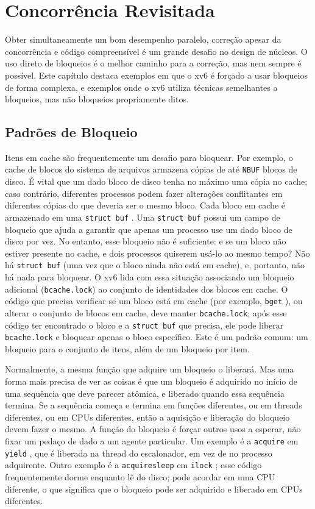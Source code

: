 \chapter{Concorrência Revisitada}
\label{CH:LOCK2}

Obter simultaneamente um bom desempenho paralelo, correção apesar da concorrência e código compreensível é um grande desafio no design de núcleos. O uso direto de bloqueios é o melhor caminho para 
a correção, mas nem sempre é possível. Este capítulo destaca exemplos em que o xv6 é forçado a usar bloqueios de forma complexa, e exemplos onde o xv6 utiliza técnicas semelhantes a bloqueios, mas 
não bloqueios propriamente ditos.

\section{Padrões de Bloqueio}

Itens em cache são frequentemente um desafio para bloquear. Por exemplo, o cache de blocos do sistema de arquivos  armazena cópias de até {\tt NBUF} blocos de disco. 
É vital que um dado bloco de disco tenha no máximo uma cópia no cache; caso contrário, diferentes processos podem fazer alterações conflitantes em diferentes cópias do que deveria ser o mesmo 
bloco. Cada bloco em cache é armazenado em uma {\tt struct buf} . Uma {\tt struct buf} possui um campo de bloqueio que ajuda a garantir que apenas um processo use um dado 
bloco de disco por vez. No entanto, esse bloqueio não é suficiente: e se um bloco não estiver presente no cache, e dois processos quiserem usá-lo ao mesmo tempo? Não há {\tt struct buf} (uma vez 
que o bloco ainda não está em cache), e, portanto, não há nada para bloquear. O xv6 lida com essa situação associando um bloqueio adicional ({\tt bcache.lock}) ao conjunto de identidades dos blocos 
em cache. O código que precisa verificar se um bloco está em cache (por exemplo, {\tt bget} ), ou alterar o conjunto de blocos em cache, deve manter {\tt bcache.lock}; 
após esse código ter encontrado o bloco e a {\tt struct buf} que precisa, ele pode liberar {\tt bcache.lock} e bloquear apenas o bloco específico. Este é um padrão comum: um bloqueio para o 
conjunto de itens, além de um bloqueio por item.

Normalmente, a mesma função que adquire um bloqueio o liberará. Mas uma forma mais precisa de ver as coisas é que um bloqueio é adquirido no início de uma sequência que deve parecer atômica, e 
liberado quando essa sequência termina. Se a sequência começa e termina em funções diferentes, ou em threads diferentes, ou em CPUs diferentes, então a aquisição e liberação do bloqueio devem fazer 
o mesmo. A função do bloqueio é forçar outros usos a esperar, não fixar um pedaço de dado a um agente particular. Um exemplo é a {\tt acquire} em {\tt yield} , que é 
liberada na thread do escalonador, em vez de no processo adquirente. Outro exemplo é a {\tt acquiresleep} em {\tt ilock} ; esse código frequentemente dorme enquanto lê 
do disco; pode acordar em uma CPU diferente, o que significa que o bloqueio pode ser adquirido e liberado em CPUs diferentes.

